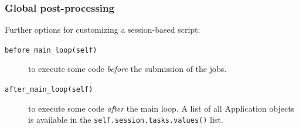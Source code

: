 \documentclass[english,serif,mathserif,xcolor=pdftex,dvipsnames,table]{beamer}
\begin{document}


\begin{frame}
  \frametitle{Global post-processing}
Further options for customizing a session-based script:
\begin{description}
\item [\texttt{before\_main\_loop(self)}] to execute some code
  \emph{before} the submission of the jobs.
\item [\texttt{after\_main\_loop(self)}] to execute some code
  \emph{after} the main loop. A list of all Application objects is
  available in the \lstinline|self.session.tasks.values()| list.
\end{description}
\end{frame}
\end{document}
